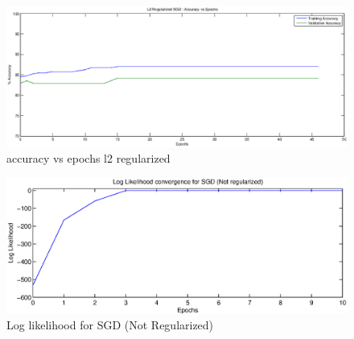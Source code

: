 \documentclass{acm_proc_article-sp}
\begin{document}
\begin{figure}\label{accuracy_vs_epochs_l2_regularized}
\centering
\includegraphics[scale=0.55]{accuracy_vs_epochs_l2_regularized.eps}
\caption{accuracy vs epochs l2 regularized}
\end{figure}

\begin{figure}
\centering
\includegraphics[scale=0.8]{Log_likelihood_for_SGD_(Not_Regularized).eps}
\caption{Log likelihood for SGD (Not Regularized)}
\end{figure}
%

 
\end{document}
